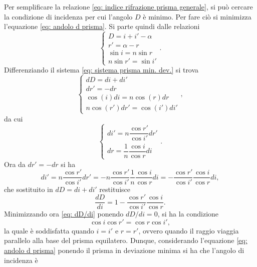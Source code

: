 Per semplificare la relazione \eqref{eq: indice rifrazione prisma generale}, si può cercare la condizione di incidenza per cui l'angolo $D$ è minimo. Per fare ciò si minimizza l'equazione \eqref{eq: andolo d prisma}. Si parte quindi dalle relazioni
\begin{equation}
    \begin{cases}
    \label{eq: sistema prisma min. dev.}
        D=i+i'-\alpha \\
        r'=\alpha-r \\
        \sin{i}=n\sin{r} \\
        n\sin{r'}=\sin{i'}
    \end{cases}.
\end{equation}
Differenziando il sistema \eqref{eq: sistema prisma min. dev.} si trova
\begin{equation}
    \begin{cases}
        dD=di+di' \\
        dr'=-dr \\
        \cos{(i)}di=n\cos{(r)}dr \\
        n\cos{(r')}dr'=\cos{(i')}di'
    \end{cases},
\end{equation}
da cui
\begin{equation}
    \begin{cases}
        di'=n\dfrac{\cos{r'}}{\cos{i'}}dr' \\[2ex]
        dr=\dfrac{1}{n}\dfrac{\cos{i}}{\cos{r}}di
    \end{cases}.
\end{equation}
Ora da $dr'=-dr$ si ha
\begin{equation}
    di'=n\frac{\cos{r'}}{\cos{i'}}dr'=-n\frac{\cos{r'}}{\cos{i'}}\frac{1}{n}\frac{\cos{i}}{\cos{r}}di=-\frac{\cos{r'}}{\cos{i'}}\frac{\cos{i}}{\cos{r}}di,
\end{equation}
che sostituito in $dD=di+di'$ restituisce
\begin{equation}
    \label{eq: dD/di}
    \frac{dD}{di}=1-\frac{\cos{r'}}{\cos{i'}}\frac{\cos{i}}{\cos{r}}.
\end{equation}
Minimizzando ora \eqref{eq: dD/di} ponendo $dD/di=0$, si ha la condizione
\begin{equation}
    \cos{i}\cos{r'}=\cos{r}\cos{i'},
\end{equation}
la quale è soddisfatta quando $i=i'$ e $r=r'$, ovvero quando il raggio viaggia parallelo alla base del prisma equilatero. Dunque, considerando l'equazione \eqref{eq: andolo d prisma} ponendo il prisma in deviazione minima si ha che l'angolo di incidenza è
